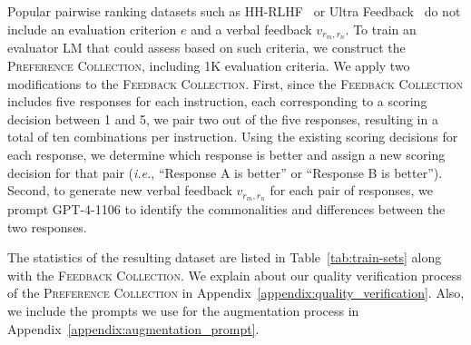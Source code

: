 \documentclass[11pt]{article}
\begin{document}
Popular pairwise ranking datasets such as HH-RLHF~\citep{bai2022training} or Ultra Feedback~\citep{cui2023ultrafeedback} do not include an evaluation criterion $e$ and a verbal feedback ${v}_{{r}_{m},{r}_{n}}$. To train an evaluator LM that could assess based on such criteria, we construct the \textsc{Preference Collection}, including 1K evaluation criteria. We apply two modifications to the \textsc{Feedback Collection}. First, since the \textsc{Feedback Collection} includes five responses for each instruction, each corresponding to a scoring decision between 1 and 5, we pair two out of the five responses, resulting in a total of ten combinations per instruction. Using the existing scoring decisions for each response, we determine which response is better and assign a new scoring decision for that pair (\textit{i.e.}, ``Response A is better'' or ``Response B is better''). Second, to generate new verbal feedback ${v}_{{r}_{m},{r}_{n}}$ for each pair of responses, we prompt GPT-4-1106 to identify the commonalities and differences between the two responses. 

The statistics of the resulting dataset are listed in Table~\ref{tab:train-sets} along with the \textsc{Feedback Collection}. We explain about our quality verification process of the \textsc{Preference Collection} in Appendix~\ref{appendix:quality_verification}. Also, we include the prompts we use for the augmentation process in Appendix~\ref{appendix:augmentation_prompt}.
\end{document}
